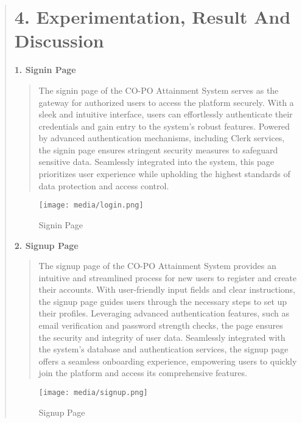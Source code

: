 \documentclass[12pt]{report}
\begin{document}
	\begin{quote}
		\section{ 4. Experimentation, Result And Discussion}
		\textbf{1. Signin Page}
		\\[5ex]
		
		\begin{quote}
			The signin page of the CO-PO Attainment System serves as the gateway for authorized users to access the platform securely. With a sleek and intuitive interface, users can effortlessly authenticate their credentials and gain entry to the system's robust features. Powered by advanced authentication mechanisms, including Clerk services, the signin page ensures stringent security measures to safeguard sensitive data. Seamlessly integrated into the system, this page prioritizes user experience while upholding the highest standards of data protection and access control.\\[5ex]
			
		\end{quote}
		\begin{figure}[h]
			\centering
			\texttt{[image: media/login.png]}\\
			\caption{Signin Page}
			\vspace{0.5cm}
		\end{figure}
		\clearpage
		
		\textbf{2. Signup Page}
		
		\begin{quote}
			The signup page of the CO-PO Attainment System provides an intuitive and streamlined process for new users to register and create their accounts. With user-friendly input fields and clear instructions, the signup page guides users through the necessary steps to set up their profiles. Leveraging advanced authentication features, such as email verification and password strength checks, the page ensures the security and integrity of user data. Seamlessly integrated with the system's database and authentication services, the signup page offers a seamless onboarding experience, empowering users to quickly join the platform and access its comprehensive features.
			\\[3ex]
			
			
			
		\end{quote}
		\begin{figure}[h]
			\centering
			\texttt{[image: media/signup.png]}\\
			\caption{Signup Page}
			\vspace{0.5cm}
		\end{figure}
		\clearpage
		

\end{quote}
\end{document}
